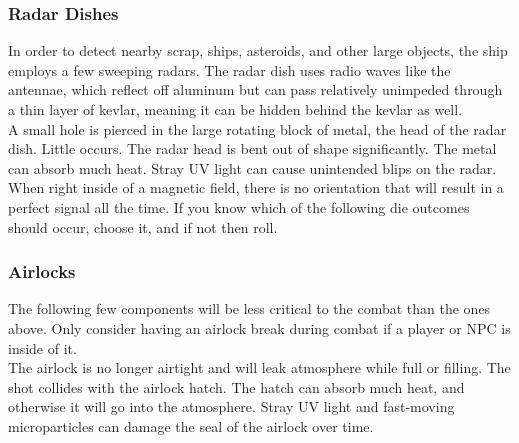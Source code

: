 \documentclass[a4paper]{article}
\begin{document}
\vspace{-0.5cm} \hspace{-18pt} \subsubsection{Radar Dishes} \label{outer_radar} \vspace{-0.2cm}
In order to detect nearby scrap, ships, asteroids, and other large objects, the ship employs a few sweeping radars. The radar dish uses radio waves like the antennae, which reflect off aluminum but can pass relatively unimpeded through a thin layer of kevlar, meaning it can be hidden behind the kevlar as well. 
\\ \pbhw
{A small hole is pierced in the large rotating block of metal, the head of the radar dish. Little occurs.}
{The radar head is bent out of shape significantly. \newline {}}
{The metal can absorb much heat.}
{Stray UV light can cause unintended blips on the radar. \newline When right inside of a magnetic field, there is no orientation that will result in a perfect signal all the time. If you know which of the following die outcomes should occur, choose it, and if not then roll. \newline {}}


\vspace{-0.5cm} \hspace{-18pt} \subsubsection{Airlocks} \label{outer_airlocks} \vspace{-0.2cm}
The following few components will be less critical to the combat than the ones above. Only consider having an airlock break during combat if a player or NPC is inside of it.
\\ \pbhw
{The airlock is no longer airtight and will leak atmosphere while full or filling. }
{The shot collides with the airlock hatch. \newline {}}
{The hatch can absorb much heat, and otherwise it will go into the atmosphere.}
{Stray UV light and fast-moving microparticles can damage the seal of the airlock over time.}
\end{document}
